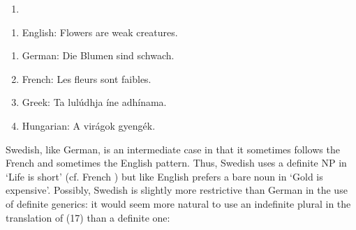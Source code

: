 \begin{enumerate} %
\item 
\end{enumerate} %
\setcounter{listLFOxcviiileveli}{0}
\begin{enumerate} %
\item 
English: Flowers are weak creatures.

\end{enumerate} %
\begin{enumerate} %
\item 
German: Die Blumen sind schwach.
\item 
French: Les fleurs sont faibles.

\item 
Greek: Ta lulúdhja íne adhínama.

\item 
Hungarian: A virágok gyengék.

\end{enumerate} %
Swedish, like German, is an intermediate case in that it sometimes follows the French and sometimes the English pattern. Thus, Swedish uses a definite NP in  ‘Life is short’ (cf. French ) but like English prefers a bare noun in  ‘Gold is expensive’. Possibly, Swedish is slightly more restrictive than German in the use of definite generics: it would seem more natural to use an indefinite plural in the translation of (17) than a definite one:

